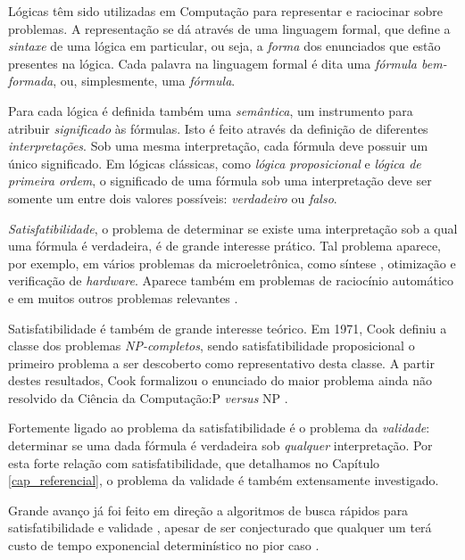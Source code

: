 \indent

Lógicas têm sido utilizadas em Computação para representar e raciocinar sobre problemas. A representação se dá através de uma linguagem formal, que define a \emph{sintaxe} de uma lógica em particular, ou seja, a \emph{forma} dos enunciados que estão presentes na lógica. Cada palavra na linguagem formal é dita uma \emph{fórmula bem-formada}, ou, simplesmente, uma \emph{fórmula}.

Para cada lógica é definida também uma \emph{semântica}, um instrumento para atribuir \emph{significado} às fórmulas. Isto é feito através da definição de diferentes \emph{interpretações}. Sob uma mesma interpretação, cada fórmula deve possuir um único significado. Em lógicas clássicas, como \emph{lógica proposicional} e \emph{lógica de primeira ordem}, o significado de uma fórmula sob uma interpretação deve ser somente um entre dois valores possíveis: \emph{verdadeiro} ou \emph{falso}.

\emph{Satisfatibilidade}, o problema de determinar se existe uma interpretação sob a qual uma fórmula é verdadeira, é de grande interesse prático. Tal problema aparece, por exemplo, em vários problemas da microeletrônica, como síntese \cite{bloem2014sat}, otimização \cite{gupta2006sat} e verificação \cite{nieuwenhuis2006sat} de \textit{hardware}. Aparece também em problemas de raciocínio automático \cite{harrison2009handbook} e em muitos outros problemas relevantes \cite{horvitz1992automated}.

Satisfatibilidade é também de grande interesse teórico. Em 1971, Cook definiu a classe dos problemas \emph{NP-completos}, sendo satisfatibilidade proposicional o primeiro problema a ser descoberto como representativo desta classe. A partir destes resultados, Cook formalizou o enunciado do maior problema ainda não resolvido da Ciência da Computação:\break P \emph{versus} NP \cite{cook1971complexity}.

Fortemente ligado ao problema da satisfatibilidade é o problema da \emph{validade}: determinar se uma dada fórmula é verdadeira sob \emph{qualquer} interpretação. Por esta forte relação com satisfatibilidade, que detalhamos no Capítulo \ref{cap_referencial}, o problema da validade é também extensamente investigado.

Grande avanço já foi feito em direção a algoritmos de busca rápidos para satisfatibilidade e validade \cite{davis1960computing,davis1962machine,biere2009conflict}, apesar de ser conjecturado que qualquer um terá custo de tempo exponencial determinístico no pior caso \cite{cook1971complexity}.

